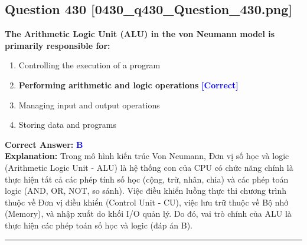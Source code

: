 \documentclass[11pt,a4paper]{article}
\begin{document}
\begin{minipage}{\textwidth}
\subsection*{Question 430 \quad \footnotesize{[0430\_q430\_Question\_430.png]}}
\noindent \textbf{The Arithmetic Logic Unit (ALU) in the von Neumann model is primarily responsible for:}

\begin{enumerate}[label=\Alph*.]
    \item Controlling the execution of a program
    \item \textbf{Performing arithmetic and logic operations} \hfill \textcolor{blue}{\textbf{[Correct]}}
    \item Managing input and output operations
    \item Storing data and programs
\end{enumerate}

\noindent \textbf{Correct Answer:} \textcolor{blue}{\textbf{B}} \\[2pt]
\noindent \textbf{Explanation:} Trong mô hình kiến trúc Von Neumann, Đơn vị số học và logic (Arithmetic Logic Unit - ALU) là hệ thống con của CPU có chức năng chính là thực hiện tất cả các phép tính số học (cộng, trừ, nhân, chia) và các phép toán logic (AND, OR, NOT, so sánh). Việc điều khiển luồng thực thi chương trình thuộc về Đơn vị điều khiển (Control Unit - CU), việc lưu trữ thuộc về Bộ nhớ (Memory), và nhập xuất do khối I/O quản lý. Do đó, vai trò chính của ALU là thực hiện các phép toán số học và logic (đáp án B).

\par\vspace{0.3cm}
\hrule
\vspace{0.3cm}
\end{minipage}
\end{document}
